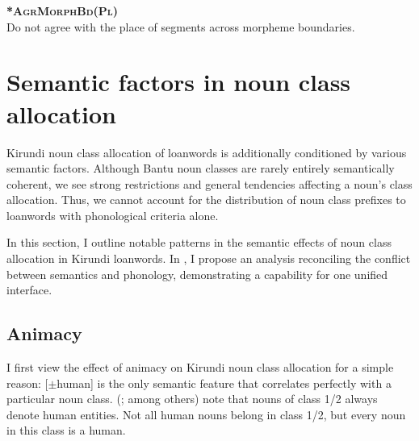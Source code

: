 \documentclass[output=paper,colorlinks,citecolor=brown,
]{langscibook}
\begin{document}
\begin{exe}
    \ex \textbf{*\textsc{AgrMorphBd(Pl)}} \\ Do not agree with the place of segments across morpheme boundaries.
\end{exe}

\begin{table}
\ShadingOn
  \caption{Evaluation of /prezidə/}
  \label{tab:kinchsular:presidenttableau}
\end{table}

\section{Semantic factors in noun class allocation} \label{sec:kinchsular:semanticfactors}

Kirundi noun class allocation of loanwords is additionally conditioned by various semantic factors. Although Bantu noun classes are rarely entirely semantically coherent, we see strong restrictions and general tendencies affecting a noun’s class allocation. Thus, we cannot account for the distribution of noun class prefixes to loanwords with phonological criteria alone.\par  In this section, I outline notable patterns in the semantic effects of noun class allocation in Kirundi loanwords. In , I propose an analysis reconciling the conflict between semantics and phonology, demonstrating a capability for one unified interface. 

\subsection{Animacy} \label{sec:kinchsular:animacy} 

I first view the effect of animacy on Kirundi noun class allocation for a simple reason: [$\pm$human] is the only semantic feature that correlates perfectly with a particular noun class. \citeauthor{zorc2007kinyarwanda} (\citeyear{zorc2007kinyarwanda}; among others) note that nouns of class 1/2 always denote human entities. Not all human nouns belong in class 1/2, but every noun in this class is a human. 
\end{document}
